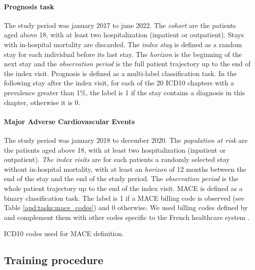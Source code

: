 \documentclass[french,12pt,twoside,a4paper]{book}
\begin{document}
\begin{appendices}
  \paragraph{Prognosis task}\label{apd:task_details:prognosis}

  The study period was january 2017 to june 2022. The \emph{cohort}
  are the patients aged above 18, with at least two hospitalization (inpatient or
  outpatient). Stays with in-hospital mortality are discarded. The \emph{index
    stay} is defined as a random stay for each individual before its last stay. The
  \emph{horizon} is the beginning of the next stay and the \emph{observation
    period} is the full patient trajectory up to the end of the index visit.
  Prognosis is defined as a multi-label classification task. In the following stay
  after the index visit, for each of the 20 ICD10 chapters with a prevalence
  greater than 1\%, the label is 1 if the stay contains a diagnosis in this
  chapter, otherwise it is 0.

  \paragraph{Major Adverse Cardiovascular Events}\label{apd:task_details:mace}

  The study period was january 2018 to december 2020. The \emph{population at
    risk} are the patients aged above 18, with at least two hospitalization
  (inpatient or outpatient). \emph{The index visits} are for each patients a
  randomly selected stay without in-hospital mortality, with at least an
  \emph{horizon} of 12 months between the end of the stay and the end of the
  study period. The \emph{observation period} is the whole patient trajectory up
  to the end of the index visit. MACE is defined as a binary classification task.
  The label is 1 if a MACE billing code is observed (see Table
  \ref{apd:tasks:mace_codes}) and 0 otherwise. We used billing codes defined by
  \cite{bosco2021major} and complement them with other codes specific to the French healthcare
  system \cite{cnam2022_top_patho}.

  \begin{table}[!tb]
    \resizebox*{\textwidth}{!}{
      
    } \caption{ICD10 codes used for MACE definition.}\label{apd:tasks:mace_codes}
  \end{table}

  \subsection{Training procedure}\label{apd:evaluation_procedure}


\end{appendices}
\end{document}

